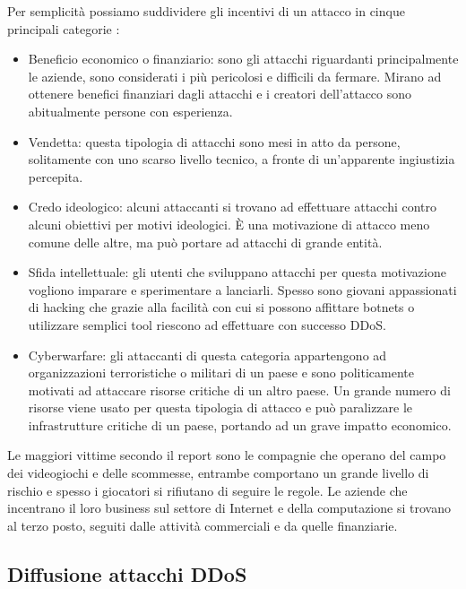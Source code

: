 Per semplicità possiamo suddividere gli incentivi di un attacco in cinque principali categorie \cite{ddos_survey_1, ddos_motivations}:

\begin{itemize}
    \item Beneficio economico o finanziario: sono gli attacchi riguardanti principalmente le aziende, sono considerati i più pericolosi e difficili da fermare. Mirano ad ottenere benefici finanziari dagli attacchi e i creatori dell'attacco sono abitualmente persone con esperienza.
    \item Vendetta: questa tipologia di attacchi sono mesi in atto da persone, solitamente con uno scarso livello tecnico, a fronte di un'apparente ingiustizia percepita.
    \item Credo ideologico: alcuni attaccanti si trovano ad effettuare attacchi contro alcuni obiettivi per motivi ideologici. È una motivazione di attacco meno comune delle altre, ma può portare ad attacchi di grande entità. %
    \item Sfida intellettuale: gli utenti che sviluppano attacchi per questa motivazione vogliono imparare e sperimentare a lanciarli. Spesso sono giovani appassionati di hacking che grazie alla facilità con cui si possono affittare botnets o utilizzare semplici tool riescono ad effettuare con successo DDoS.
    \item Cyberwarfare: gli attaccanti di questa categoria appartengono ad organizzazioni terroristiche o militari di un paese e sono politicamente motivati ad attaccare risorse critiche di un altro paese. Un grande numero di risorse viene usato per questa tipologia di attacco e può paralizzare le infrastrutture critiche di un paese, portando ad un grave impatto economico.
\end{itemize}


Le maggiori vittime secondo il report \cite{imperva_ddos_report} sono le compagnie che operano del campo dei videogiochi e delle scommesse, entrambe comportano un grande livello di rischio e spesso i giocatori si rifiutano di seguire le regole. Le aziende che incentrano il loro business sul settore di Internet e della computazione si trovano al terzo posto, seguiti dalle attività commerciali e da quelle finanziarie.


\subsection{Diffusione attacchi DDoS}



